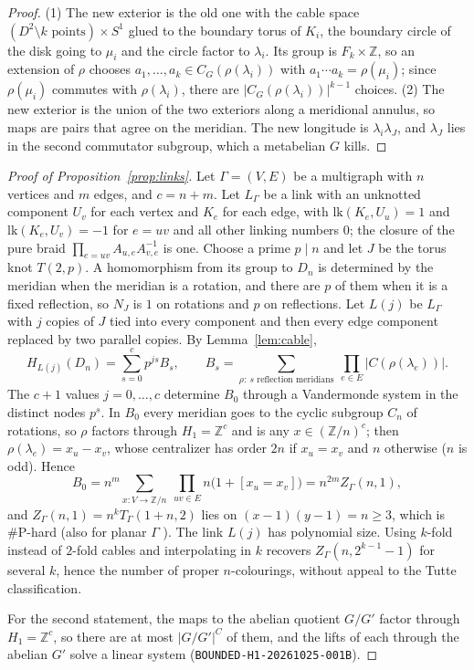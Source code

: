 \documentclass[11pt]{article}
\theoremstyle{definition}
\theoremstyle{remark}
\newcommand{\Z}{\mathbb{Z}}
\newcommand{\sharpP}{\#\mathrm{P}}
\begin{document}
\begin{proof}
(1) The new exterior is the old one with the cable space
$(D^2\setminus k\text{ points})\times S^1$ glued to the boundary torus of $K_i$,
the boundary circle of the disk going to $\mu_i$ and the circle factor to
$\lambda_i$. Its group is $F_k\times\Z$, so an extension of $\rho$ chooses
$a_1,\dots,a_k\in C_G(\rho(\lambda_i))$ with $a_1\cdots a_k=\rho(\mu_i)$; since
$\rho(\mu_i)$ commutes with $\rho(\lambda_i)$, there are $|C_G(\rho(\lambda_i))|^{k-1}$
choices. (2) The new exterior is the union of the two exteriors along a
meridional annulus, so maps are pairs that agree on the meridian. The new
longitude is $\lambda_i\lambda_J$, and $\lambda_J$ lies in the second commutator
subgroup, which a metabelian $G$ kills.
\end{proof}

\begin{proof}[Proof of Proposition~\ref{prop:links}]
Let $\Gamma=(V,E)$ be a multigraph with $n$ vertices and $m$ edges, and
$c=n+m$. Let $L_\Gamma$ be a link with an unknotted component $U_v$ for each
vertex and $K_e$ for each edge, with $\mathrm{lk}(K_e,U_u)=1$ and
$\mathrm{lk}(K_e,U_v)=-1$ for $e=uv$ and all other linking numbers $0$; the
closure of the pure braid $\prod_{e=uv}A_{u,e}A_{v,e}^{-1}$ is one. Choose a
prime $p\mid n$ and let $J$ be the torus knot $T(2,p)$. A homomorphism from its
group to $D_n$ is determined by the meridian when the meridian is a rotation,
and there are $p$ of them when it is a fixed reflection, so $N_J$ is $1$ on
rotations and $p$ on reflections. Let $L(j)$ be $L_\Gamma$ with $j$ copies of
$J$ tied into every component and then every edge component replaced by two
parallel copies. By Lemma~\ref{lem:cable},
\[
H_{L(j)}(D_n)=\sum_{s=0}^{c}p^{js}B_s,\qquad
B_s=\sum_{\rho:\ s\text{ reflection meridians}}\ \prod_{e\in E}|C(\rho(\lambda_e))|.
\]
The $c+1$ values $j=0,\dots,c$ determine $B_0$ through a Vandermonde system in
the distinct nodes $p^s$. In $B_0$ every meridian goes to the cyclic subgroup
$C_n$ of rotations, so $\rho$ factors through $H_1=\Z^c$ and is any
$x\in(\Z/n)^c$; then $\rho(\lambda_e)=x_u-x_v$, whose centralizer has order $2n$
if $x_u=x_v$ and $n$ otherwise ($n$ is odd). Hence
\[
B_0=n^m\sum_{x\colon V\to\Z/n}\ \prod_{uv\in E}n\bigl(1+[x_u=x_v]\bigr)=n^{2m}Z_\Gamma(n,1),
\]
and $Z_\Gamma(n,1)=n^kT_\Gamma(1+n,2)$ lies on $(x-1)(y-1)=n\ge3$, which is
$\sharpP$-hard \cite{JVW90} (also for planar $\Gamma$ \cite{Ver05}). The link $L(j)$
has polynomial size. Using $k$-fold instead of $2$-fold cables and
interpolating in $k$ recovers $Z_\Gamma(n,2^{k-1}-1)$ for several $k$, hence the
number of proper $n$-colourings, without appeal to the Tutte classification.

For the second statement, the maps to the abelian quotient $G/G'$ factor
through $H_1=\Z^c$, so there are at most $|G/G'|^C$ of them, and the lifts of each
through the abelian $G'$ solve a linear system (\texttt{BOUNDED-H1-20261025-001B}).
\end{proof}
\end{document}
